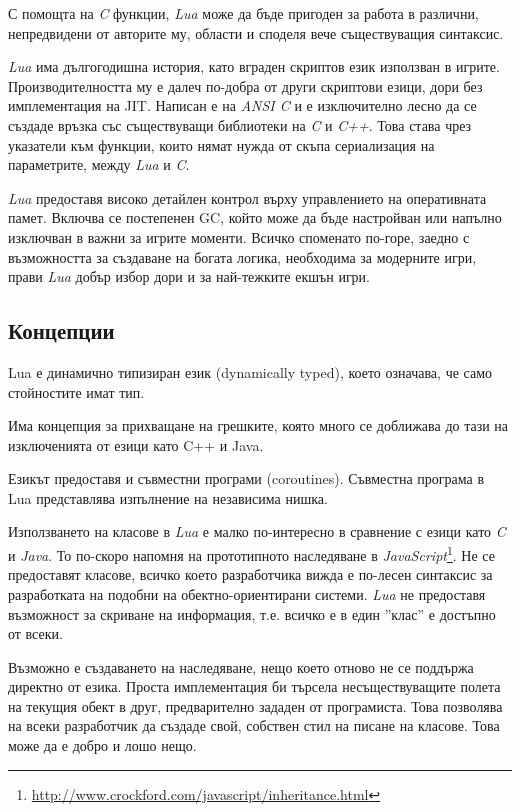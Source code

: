 		С помощта на \emph{C} функции, \emph{Lua} може да бъде пригоден за работа в различни, непредвидени от авторите му,
		области и споделя вече съществуващия синтаксис.
		
		\emph{Lua} има дългогодишна история, като вграден скриптов език използван в игрите. Производителността му
		е далеч по-добра от други скриптови езици, дори без имплементация на \ac{JIT}. Написан е на
		\emph{ANSI C} и е изключително лесно да се създаде връзка със съществуващи библиотеки на \emph{C} и \emph{C++}.
		Това става чрез указатели към функции, които нямат нужда от скъпа сериализация на параметрите, между \emph{Lua} и \emph{C}.
		
		\emph{Lua} предоставя високо детайлен контрол върху управлението на оперативната памет. Включва се
		постепенен \ac{GC}, който може да бъде настройван или напълно изключван в важни за игрите моменти.
		Всичко споменато по-горе, заедно с възможността за създаване на богата логика, необходима за модерните игри,
		прави \emph{Lua} добър избор дори и за най-тежките екшън игри.		
		
		\subsection{Концепции}					
		
			Lua е динамично типизиран език (dynamically typed), което означава, че само стойностите имат тип.			
			
			Има концепция за прихващане на грешките, която много се доближава до тази на изключенията от езици като
			C++ и Java.
			
			Езикът предоставя и съвместни програми (coroutines). Съвместна програма в Lua представлява изпълнение на независима нишка.		
			
			Използването на класове в \emph{Lua} е малко по-интересно в сравнение с езици като \emph{C} и \emph{Java}. 
			То по-скоро напомня на прототипното наследяване в
			\emph{JavaScript}\footnote{\url{http://www.crockford.com/javascript/inheritance.html}}.
			Не се предоставят класове, всичко което разработчика вижда е по-лесен синтаксис за разработката 
			на подобни на обектно-ориентирани системи.
			\emph{Lua} не предоставя възможност за скриване на информация, т.е. всичко е в един ''клас'' е достъпно
			от всеки. 
			
			Възможно е създаването на наследяване, нещо което отново не се поддържа директно от езика. Проста имплементация
			би търсела несъществуващите полета на текущия обект в друг, предварително зададен от програмиста. \cite{Figueiredo}
			Това позволява на всеки разработчик да създаде свой, собствен стил на писане на класове. Това може да е добро и лошо нещо.
			
